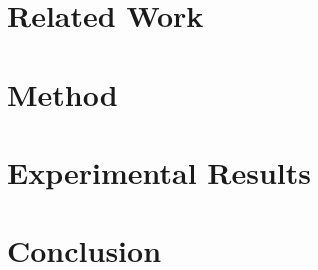 \documentclass[acmlarge]{acmart}
\newcommand{\minesp}{\textsc{Sprintz}\text{ }}
\begin{document}
\section{Related Work} \label{sec:relatedWork}



\section{Method} \label{sec:method}



\section{Experimental Results} \label{sec:results}




% 



\section{Conclusion} \label{sec:conclusion}
\end{document}
